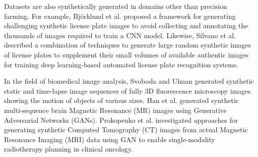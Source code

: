 Datasets are also synthetically generated in domains other than precision farming. For example, Bj{\"o}rklund et al. \cite{bjorklund2019robust}proposed a framework for generating challenging synthetic license plate images to avoid collecting and annotating the thousands of images required to train a CNN model. 
Likewise, Silvano et al. \cite{silvano2021synthetic} described a combination of techniques to generate large random synthetic images of license plates to supplement their small volumes of available authentic images for training deep learning-based automated license plate recognition systems.

In the field of biomedical image analysis, Svoboda and Ulman \cite{svoboda2012generation} generated synthetic static and time-lapse image sequences of fully 3D fluorescence microscopy images showing the motion of objects of various sizes. Han et al. \cite{han2018gan} generated synthetic multi-sequence brain Magnetic Resonance (MR) images using Generative Adversarial Networks (GANs). Prokopenko et al. \cite{prokopenko2019unpaired} investigated approaches for generating synthetic Computed Tomography (CT) images from actual Magnetic Resonance Imaging (MRI) data using GAN to enable single-modality radiotherapy planning in clinical oncology.


